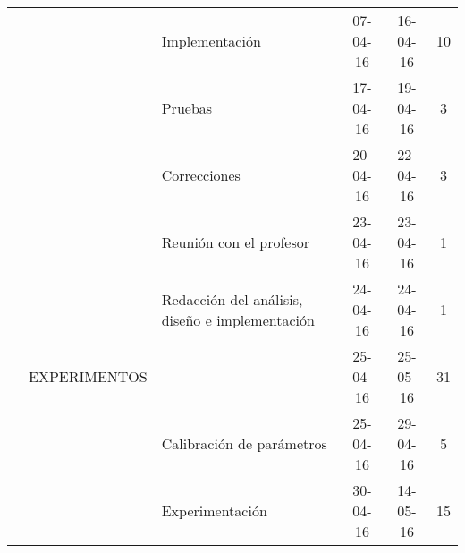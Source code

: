 \begin{table}[H]
{\begin{tabular}{lllccc}
     &                               & Implementación                                     & 07-04-16                                                           & 16-04-16                                                            & 10                                                                 \\
     &                               & Pruebas                                            & 17-04-16                                                           & 19-04-16                                                            & 3                                                                  \\
     &                               & Correcciones                                       & 20-04-16                                                           & 22-04-16                                                            & 3                                                                  \\
     &                               & Reunión con el profesor                            & 23-04-16                                                           & 23-04-16                                                            & 1                                                                  \\
     &                               & Redacción del análisis, diseño e implementación    & 24-04-16                                                           & 24-04-16                                                            & 1                                                                  \\ \hline
     & EXPERIMENTOS                  &                                                    & 25-04-16                                                           & 25-05-16                                                            & 31                                                                 \\
     &                               & Calibración de parámetros                          & 25-04-16                                                           & 29-04-16                                                            & 5                                                                  \\
     &                               & Experimentación                                    & 30-04-16                                                           & 14-05-16                                                            & 15                                                                 \\

\end{tabular}}
\end{table}
